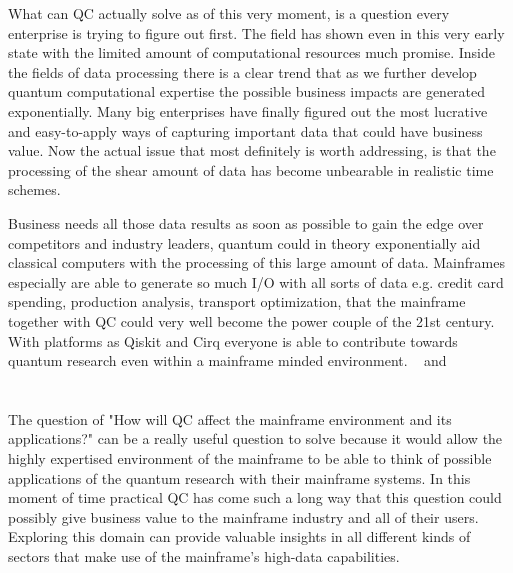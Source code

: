 What can QC actually solve as of this very moment, is a question every enterprise is trying to figure out first. The field has shown even in this very early state with the limited amount of computational resources much promise. Inside the fields of data processing there is a clear trend that as we further develop quantum computational expertise the possible business impacts are generated exponentially. Many big enterprises have finally figured out the most lucrative and easy-to-apply ways of capturing important data that could have business value. Now the actual issue that most definitely is worth addressing, is that the processing of the shear amount of data has become unbearable in realistic time schemes. 

Business needs all those data results as soon as possible to gain the edge over competitors and industry leaders, quantum could in theory exponentially aid classical computers with the processing of this large amount of data. Mainframes especially are able to generate so much I/O with all sorts of data e.g. credit card spending, production analysis, transport optimization, that the mainframe together with QC could very well become the power couple of the 21st century. With platforms as Qiskit and Cirq everyone is able to contribute towards quantum research even within a mainframe minded environment.  ~\autocite{Qiskit} and ~\autocite{Cirq}

\section{}
\label{sec:onderzoeksvraag}

The question of "How will QC affect the mainframe environment and its applications?" can be a really useful question to solve because it would allow the highly expertised environment of the mainframe to be able to think of possible applications of the quantum research with their mainframe systems. In this moment of time practical QC has come such a long way that this question could possibly give business value to the mainframe industry and all of their users. Exploring this domain can provide valuable insights in all different kinds of sectors that make use of the mainframe's high-data capabilities.

\section{}
\label{sec:onderzoeksdoelstelling}

